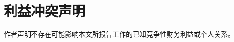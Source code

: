 \documentclass{iopjournal}
\begin{document}

\section*{利益冲突声明}

作者声明不存在可能影响本文所报告工作的已知竞争性财务利益或个人关系。



\end{document}
